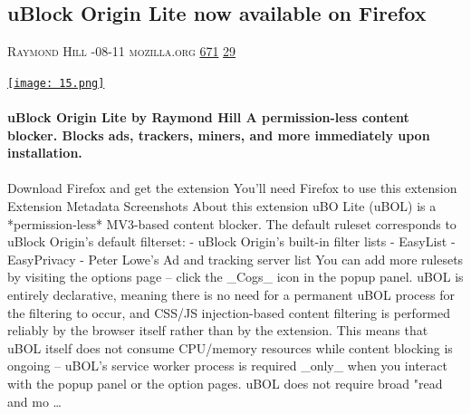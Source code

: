 \documentclass[10pt,a4paper]{article}
\begin{document}
\begin{multicols}{2}
\raggedcolumns
\noindent\begin{minipage}{\linewidth}
\medskip
\subsection{uBlock Origin Lite now available on Firefox}
\textsc{\footnotesize
{\scriptsize\faUser}\space 
Raymond Hill 
{\scriptsize\faCalendar}-08-11 
{\scriptsize\faGlobe}\space 
mozilla.org 
{\scriptsize\faThumbsOUp}\space 
\href{http://news.ycombinator.com/item?id=37215557\&utm\_term=comment}{671} 
{\scriptsize\faComments}\space 
\href{http://news.ycombinator.com/item?id=37215557\&utm\_term=comment}{29} 
}
\par\medskip\noindent
\href{https://addons.mozilla.org/en-US/firefox/addon/ublock-origin-lite/?utm\_source=hackernewsletter\&utm\_medium=email\&utm\_term=show\_hn}{
    \texttt{[image: 15.png]}
}
\end{minipage}
\paragraph{}
\textbf{uBlock Origin Lite by Raymond Hill
A permission-less content blocker. Blocks ads, trackers, miners, and more immediately upon installation.}
\paragraph{}

Download Firefox and get the extension
You'll need Firefox to use this extension
Extension Metadata
Screenshots
About this extension
uBO Lite (uBOL) is a *permission-less* MV3-based content blocker.
The default ruleset corresponds to uBlock Origin's default filterset:
- uBlock Origin's built-in filter lists
- EasyList
- EasyPrivacy
- Peter Lowe’s Ad and tracking server list
You can add more rulesets by visiting the options page -- click the \_Cogs\_ icon in the popup panel.
uBOL is entirely declarative, meaning there is no need for a permanent uBOL process for the filtering to occur, and CSS/JS injection-based content filtering is performed reliably by the browser itself rather than by the extension. This means that uBOL itself does not consume CPU/memory resources while content blocking is ongoing -- uBOL's service worker process is required \_only\_ when you interact with the popup panel or the option pages.
uBOL does not require broad "read and mo
\dots\par
\noindent\begin{minipage}{\linewidth}
\medskip

\end{minipage}
\end{multicols}
\end{document}
